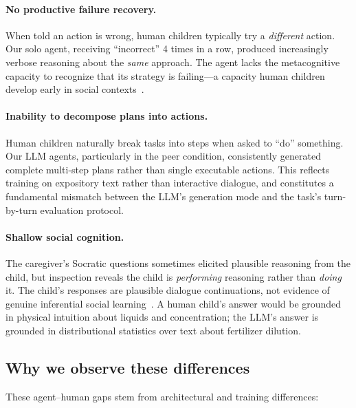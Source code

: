 \documentclass{article}
\begin{document}
\paragraph{No productive failure recovery.} When told an action is wrong, human children typically try a \emph{different} action. Our solo agent, receiving ``incorrect'' 4 times in a row, produced increasingly verbose reasoning about the \emph{same} approach. The agent lacks the metacognitive capacity to recognize that its strategy is failing---a capacity human children develop early in social contexts~\citep{gweon2021inferential}.

\paragraph{Inability to decompose plans into actions.} Human children naturally break tasks into steps when asked to ``do'' something. Our LLM agents, particularly in the peer condition, consistently generated complete multi-step plans rather than single executable actions. This reflects training on expository text rather than interactive dialogue, and constitutes a fundamental mismatch between the LLM's generation mode and the task's turn-by-turn evaluation protocol.

\paragraph{Shallow social cognition.} The caregiver's Socratic questions sometimes elicited plausible reasoning from the child, but inspection reveals the child is \emph{performing} reasoning rather than \emph{doing} it. The child's responses are plausible dialogue continuations, not evidence of genuine inferential social learning~\citep{gweon2021inferential}. A human child's answer would be grounded in physical intuition about liquids and concentration; the LLM's answer is grounded in distributional statistics over text about fertilizer dilution.

\subsection{Why we observe these differences}

These agent--human gaps stem from architectural and training differences:
\end{document}
